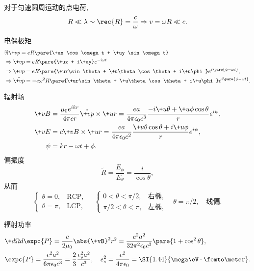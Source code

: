 \documentclass[hidelinks]{ctexart}
\begin{document}
\begin{sample}
    \begin{ex}
        对于匀速圆周运动的点电荷,
        \[ R \ll \lambda \sim \rec{R} = \frac{c}{\omega} \Rightarrow v = \omega R \ll c. \]
        \begin{cenum}
            \item 电偶极矩
            \begin{align*}
                & \Re \+vp = eR\pare{\+ux \cos\omega t + \+uy \sin\omega t} \\
                & \Rightarrow \+vp = eR\pare{\+ux + i\+uy} e^{-i\omega t} \\
                & \Rightarrow {\+vp} = eR\pare{\+ur\sin\theta + \+u\theta\cos\theta + i\+u\phi} e^{i\pare{\phi - \omega t}}, \\
                & \Rightarrow \ddot{\+vp} = -e\omega^2 R\pare{\+ur\sin\theta + \+u\theta\cos\theta + i\+u\phi} e^{i\pare{\phi - \omega t}}.
            \end{align*}
            \item 辐射场
            \begin{align*}
                \+vB &= \frac{\mu_0 e^{ikr}}{4\pi c r}\ddot{\+vp}\times \+ur = \frac{ea}{4\pi\epsilon_0 c^3} \frac{-i\+u\theta + \+u\phi\cos\theta}{r}e^{i\psi}, \\
                \+vE &= c\+vB\times\+ur = \frac{ea}{4\pi\epsilon_0 c^2} \frac{\+u\theta\cos\theta + i\+u\phi}{r}e^{i\psi}, \\
                \psi &= kr - \omega t + \phi.
            \end{align*}
            偏振度
            \[ \tilde{R} = \frac{E_\phi}{E_\theta} = \frac{i}{\cos\theta}, \]
            从而
            \[ \begin{cases}
                \theta = 0, & \mathrm{RCP}, \\
                \theta = \pi, & \mathrm{LCP},
            \end{cases}\quad \begin{cases}
                0<\theta<\pi/2, & \text{右椭},\\
                \pi/2 < \theta<\pi, & \text{左椭},
            \end{cases}\quad \theta = \pi/2,\quad \text{线偏}. \]
            \item 辐射功率
            \begin{align*}
                & \+d\Omega d{\expc{P}} = \frac{c}{2\mu_0} \abs{\+vB}^2 r^2 = \frac{e^2a^2}{32\pi^2 \epsilon_0 c^3}\pare{1+\cos^2\theta}, \\
                & \expc{P} = \frac{e^2 a^2}{6\pi\epsilon_0 c^3} = \frac{2}{3}\frac{e_s^2 a^2}{c^3},\quad e_s^2 = \frac{e^2}{4\pi\epsilon_0} = \SI{1.44}{\mega\eV\cdot \femto\meter}.
            \end{align*}
        \end{cenum}
    \end{ex}
\end{sample}
\end{document}

